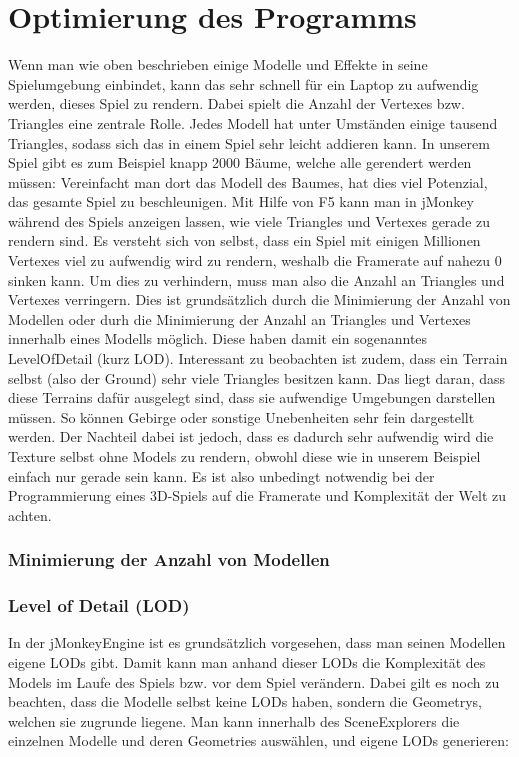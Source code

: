 \section{Optimierung des Programms}\label{sec:optimizing}
Wenn man wie oben beschrieben einige Modelle und Effekte in seine Spielumgebung einbindet, kann das sehr schnell für ein Laptop zu aufwendig werden, dieses Spiel zu rendern. Dabei spielt die Anzahl der Vertexes bzw. Triangles eine zentrale Rolle. Jedes Modell hat unter Umständen einige tausend Triangles, sodass sich das in einem Spiel sehr leicht addieren kann. In unserem Spiel gibt es zum Beispiel knapp 2000 Bäume, welche alle gerendert werden müssen: Vereinfacht man dort das Modell des Baumes, hat dies viel Potenzial, das gesamte Spiel zu beschleunigen. Mit Hilfe von F5 kann man in jMonkey während des Spiels anzeigen lassen, wie viele Triangles und Vertexes gerade zu rendern sind. Es versteht sich von selbst, dass ein Spiel mit einigen Millionen Vertexes viel zu aufwendig wird zu rendern, weshalb die Framerate auf nahezu 0 sinken kann. Um dies zu verhindern, muss man also die Anzahl an Triangles und Vertexes verringern. Dies ist grundsätzlich durch die Minimierung der Anzahl von Modellen oder durh die Minimierung der Anzahl an Triangles und Vertexes innerhalb eines Modells möglich. Diese haben damit ein sogenanntes LevelOfDetail (kurz LOD). Interessant zu beobachten ist zudem, dass ein Terrain selbst (also der Ground) sehr viele Triangles besitzen kann. Das liegt daran, dass diese Terrains dafür ausgelegt sind, dass sie aufwendige Umgebungen darstellen müssen. So können Gebirge oder sonstige Unebenheiten sehr fein dargestellt werden. Der Nachteil dabei ist jedoch, dass es dadurch sehr aufwendig wird die Texture selbst ohne Models zu rendern, obwohl diese wie in unserem Beispiel einfach nur gerade sein kann. Es ist also unbedingt notwendig bei der Programmierung eines 3D-Spiels auf die Framerate und Komplexität der Welt zu achten.



\subsubsection{Minimierung der Anzahl von Modellen}

\subsubsection{Level of Detail (LOD)}
In der jMonkeyEngine ist es grundsätzlich vorgesehen, dass man seinen Modellen eigene LODs gibt. Damit kann man anhand dieser LODs die Komplexität des Models im Laufe des Spiels bzw. vor dem Spiel verändern. Dabei gilt es noch zu beachten, dass die Modelle selbst keine LODs haben, sondern die Geometrys, welchen sie zugrunde liegene. Man kann innerhalb des SceneExplorers die einzelnen Modelle und deren Geometries auswählen, und eigene LODs generieren:

